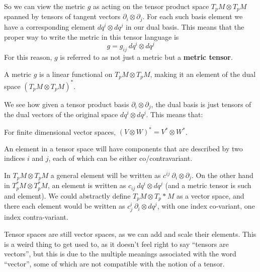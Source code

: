 \documentclass[../master.tex]{subfiles}
\begin{document}
	So we can view the metric $g$ as acting on the tensor product space $T_p M \otimes T_p M$ spanned by tensors of tangent vectors $\partial_i \otimes \partial_j$. For each such basis element we have a corresponding element $dq^i \otimes dq^j$ in our dual basis. This means that the proper way to write the metric in this tensor language is 
	\begin{equation}
		g = g_{ij} ~ dq^i \otimes dq^j
	\end{equation}
	For this reason, $g$ is referred to as not just a metric but a \textbf{metric tensor}.
	\begin{obs}
		A metric $g$ is a linear functional on $T_p M \otimes T_p M$, making it an element of the dual space $(T_p M \otimes T_p M)^*$.
	\end{obs}
	We see how given a tensor product basis $\partial_i \otimes \partial_j$, the dual basis is just tensors of the dual vectors of the original space $dq^i \otimes dq^j$. This means that: 
	\begin{obs}
		For finite dimensional vector spaces, $(V\otimes W)^* = V^* \otimes W^*$.
	\end{obs}
	An element in a tensor space will have components that are described by two indices $i$ and $j$, each of which can be either co/contravariant. 
	\begin{example}
		In $T_p M \otimes T_p M$ a general element will be written as $c^{ij} ~\partial_i \otimes \partial_j$. On the other hand in $T_p^* M \otimes T_p^* M$, an element is written as $c_{ij}~dq^i \otimes dq^j$ (and a metric tensor is such and element). We could abstractly define $T_p M \otimes T_p* M$ as a vector space, and there each element would be written as $c^i_j~\partial_i \otimes dq^j$, with one index co-variant, one index contra-variant.
	\end{example}
	
	\begin{nb}
		Tensor spaces are still vector spaces, as we can add and scale their elements. This is a weird thing to get used to, as it doesn't feel right to say ``tensors are vectors'', but this is due to the multiple meanings associated with the word ``vector'', some of which are not compatible with the notion of a tensor.
	\end{nb}
\end{document}

